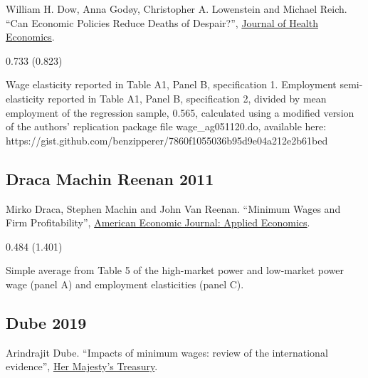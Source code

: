 \noindent William H. Dow, Anna Godøy, Christopher A. Lowenstein and Michael Reich. ``Can Economic Policies Reduce Deaths of Despair?'', \href{https://doi.org/10.1016/j.jhealeco.2020.102372}{Journal of Health Economics}.

\vspace{0.7em}

 0.733 (0.823)

\vspace{0.7em}

 Wage elasticity reported in Table A1, Panel B, specification 1. Employment semi-elasticity reported in Table A1, Panel B, specification 2, divided by mean employment of the regression sample, 0.565, calculated using a modified version of the authors' replication package file wage\_ag051120.do, available here: https://gist.github.com/benzipperer/7860f1055036b95d9e04a212e2b61bed

\subsection*{Draca Machin Reenan 2011}
\vspace{-0.7em}

\noindent Mirko Draca, Stephen Machin and John Van Reenan. ``Minimum Wages and Firm Profitability'', \href{https://doi.org/10.1257/app.3.1.129}{American Economic Journal: Applied Economics}.

\vspace{0.7em}

 0.484 (1.401)

\vspace{0.7em}

 Simple average from Table 5 of the high-market power and low-market power wage (panel A) and employment elasticities (panel C).

\subsection*{Dube 2019}
\vspace{-0.7em}

\noindent Arindrajit Dube. ``Impacts of minimum wages: review of the international evidence'', \href{https://assets.publishing.service.gov.uk/government/uploads/system/uploads/attachment_data/file/844350/impacts_of_minimum_wages_review_of_the_international_evidence_Arindrajit_Dube_web.pdf}{Her Majesty's Treasury}.

